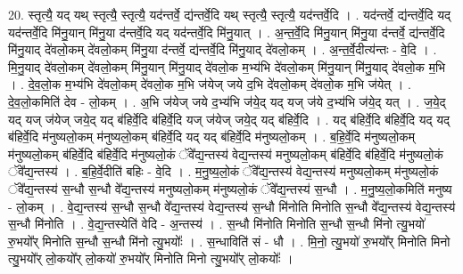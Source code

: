 \documentclass[17pt]{extarticle}
\begin{document}
20. स्तृत्यै॒ यद् यथ् स्तृत्यै॒ स्तृत्यै॒ यद॑न्तर्वे॒ द्य॑न्तर्वे॒दि यथ् स्तृत्यै॒ स्तृत्यै॒ यद॑न्तर्वे॒दि । . यद॑न्तर्वे॒ द्य॑न्तर्वे॒दि यद् यद॑न्तर्वे॒दि मि॑नु॒यान् मि॑नु॒या द॑न्तर्वे॒दि यद् यद॑न्तर्वे॒दि मि॑नु॒यात् । . अ॒न्त॒र्वे॒दि मि॑नु॒यान् मि॑नु॒या द॑न्तर्वे॒ द्य॑न्तर्वे॒दि मि॑नु॒याद् दे॑वलो॒कम् दे॑वलो॒कम् मि॑नु॒या द॑न्तर्वे॒ द्य॑न्तर्वे॒दि मि॑नु॒याद् दे॑वलो॒कम् । . अ॒न्त॒र्वे॒दीत्य॑न्तः - वे॒दि । . मि॒नु॒याद् दे॑वलो॒कम् दे॑वलो॒कम् मि॑नु॒यान् मि॑नु॒याद् दे॑वलो॒क म॒भ्य॑भि दे॑वलो॒कम् मि॑नु॒यान् मि॑नु॒याद् दे॑वलो॒क म॒भि । . दे॒व॒लो॒क म॒भ्य॑भि दे॑वलो॒कम् दे॑वलो॒क म॒भि ज॑येज् जये द॒भि दे॑वलो॒कम् दे॑वलो॒क म॒भि ज॑येत् । . दे॒व॒लो॒कमिति॑ देव - लो॒कम् । . अ॒भि ज॑येज् जये द॒भ्य॑भि ज॑ये॒द् यद् यज् ज॑ये द॒भ्य॑भि ज॑ये॒द् यत् । . ज॒ये॒द् यद् यज् ज॑येज् जये॒द् यद् ब॑हिर्वे॒दि ब॑हिर्वे॒दि यज् ज॑येज् जये॒द् यद् ब॑हिर्वे॒दि । . यद् ब॑हिर्वे॒दि ब॑हिर्वे॒दि यद् यद् ब॑हिर्वे॒दि म॑नुष्यलो॒कम् म॑नुष्यलो॒कम् ब॑हिर्वे॒दि यद् यद् ब॑हिर्वे॒दि म॑नुष्यलो॒कम् । . ब॒हि॒र्वे॒दि म॑नुष्यलो॒कम् म॑नुष्यलो॒कम् ब॑हिर्वे॒दि ब॑हिर्वे॒दि म॑नुष्यलो॒कं ॅवे᳚द्य॒न्तस्य॑ वेद्य॒न्तस्य॑ मनुष्यलो॒कम् ब॑हिर्वे॒दि ब॑हिर्वे॒दि म॑नुष्यलो॒कं ॅवे᳚द्य॒न्तस्य॑ । . ब॒हि॒र्वे॒दीति॑ बहिः - वे॒दि । . म॒नु॒ष्य॒लो॒कं ॅवे᳚द्य॒न्तस्य॑ वेद्य॒न्तस्य॑ मनुष्यलो॒कम् म॑नुष्यलो॒कं ॅवे᳚द्य॒न्तस्य॑ स॒न्धौ स॒न्धौ वे᳚द्य॒न्तस्य॑ मनुष्यलो॒कम् म॑नुष्यलो॒कं ॅवे᳚द्य॒न्तस्य॑ स॒न्धौ । . म॒नु॒ष्य॒लो॒कमिति॑ मनुष्य - लो॒कम् । . वे॒द्य॒न्तस्य॑ स॒न्धौ स॒न्धौ वे᳚द्य॒न्तस्य॑ वेद्य॒न्तस्य॑ स॒न्धौ मि॑नोति मिनोति स॒न्धौ वे᳚द्य॒न्तस्य॑ वेद्य॒न्तस्य॑ स॒न्धौ मि॑नोति । . वे॒द्य॒न्तस्येति॑ वेदि - अ॒न्तस्य॑ । . स॒न्धौ मि॑नोति मिनोति स॒न्धौ स॒न्धौ मि॑नो त्यु॒भयो॑ रु॒भयो᳚र् मिनोति स॒न्धौ स॒न्धौ मि॑नो त्यु॒भयोः᳚ । . स॒न्धाविति॑ सं - धौ । . मि॒नो॒ त्यु॒भयो॑ रु॒भयो᳚र् मिनोति मिनो त्यु॒भयो᳚र् लो॒कयो᳚र् लो॒कयो॑ रु॒भयो᳚र् मिनोति मिनो त्यु॒भयो᳚र् लो॒कयोः᳚ । \newline
\end{document}
